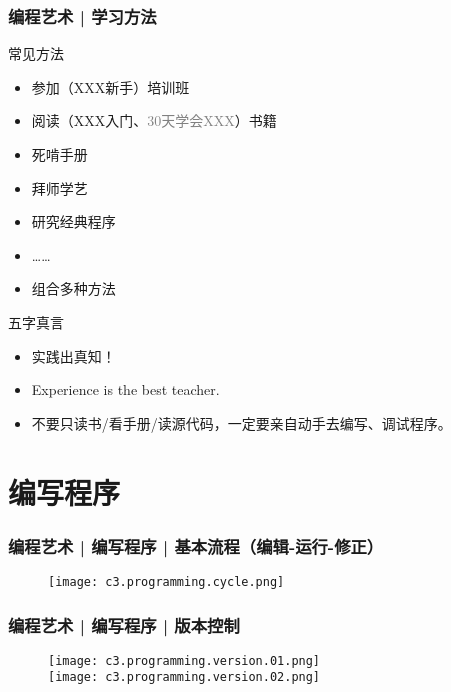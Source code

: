 \begin{frame}
  \frametitle{编程艺术 | 学习方法}
  \begin{block}{常见方法}
    \begin{itemize}
      \item 参加（XXX新手）培训班
      \item 阅读（XXX入门、\textcolor{gray}{30天学会XXX}）书籍
      \item 死啃手册
      \item 拜师学艺
      \item 研究经典程序
      \item ……
      \item 组合多种方法
    \end{itemize}
  \end{block}
  \pause
  \begin{block}{\alert{五字真言}}
    \begin{itemize}
      \item 实践出真知！
      \item Experience is the best teacher.
      \item 不要只读书/看手册/读源代码，一定要亲自动手去编写、调试程序。
    \end{itemize}
  \end{block}
\end{frame}

\section{编写程序}
\begin{frame}
  \frametitle{编程艺术 | 编写程序 | \alert{基本流程（编辑-运行-修正）}}
  \begin{figure}
    \centering
    \texttt{[image: c3.programming.cycle.png]}
  \end{figure}
\end{frame}

\begin{frame}
  \frametitle{编程艺术 | 编写程序 | 版本控制}
  \begin{figure}
    \centering
    \texttt{[image: c3.programming.version.01.png]}\\
    \texttt{[image: c3.programming.version.02.png]}\\
  \end{figure}
\end{frame}

